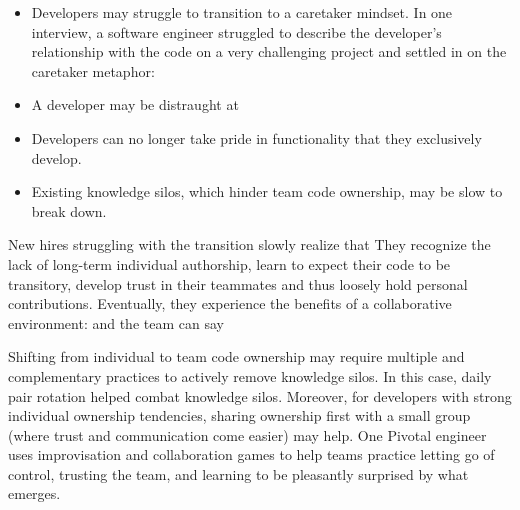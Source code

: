 \begin{itemize}  

\item Developers may struggle to transition to a caretaker mindset.  In one interview, a software engineer struggled to describe the developer's relationship with the code on a very challenging project and settled in on the caretaker metaphor:  

\item A developer may be distraught at  

\item Developers can no longer take pride in functionality that they exclusively develop.

\item Existing knowledge silos, which hinder team code ownership, may be slow to break down.
 
\end{itemize}

New hires struggling with the transition slowly realize that  They recognize the lack of long-term individual authorship, learn to expect their code to be transitory, develop trust in their teammates and thus loosely hold personal contributions.  Eventually,  they experience the benefits of a collaborative environment:  and the team can say 

Shifting from individual to team code ownership may require multiple and complementary practices to actively remove knowledge silos. In this case, daily pair rotation helped combat knowledge silos. Moreover, for developers with strong individual ownership tendencies, sharing ownership first with a small group (where trust and communication come easier) may help. One Pivotal engineer uses improvisation and collaboration games to help teams practice letting go of control, trusting the team, and learning to be pleasantly surprised by what emerges. 

